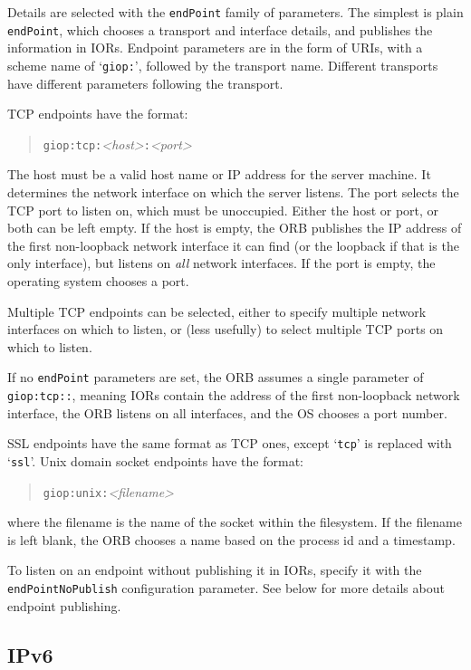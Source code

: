 \documentclass[11pt,twoside,a4paper]{book}
\newcommand{\code}[1]{\texttt{#1}}
\begin{document}
Details are selected with the \code{endPoint} family of parameters.
The simplest is plain \code{endPoint}, which chooses a transport and
interface details, and publishes the information in IORs. Endpoint
parameters are in the form of URIs, with a scheme name of
`\code{giop:}', followed by the transport name. Different transports
have different parameters following the transport.

TCP endpoints have the format:

\begin{quote}
\code{giop:tcp:}\textit{<host>}\code{:}\textit{<port>}
\end{quote}

\noindent The host must be a valid host name or IP address for the
server machine.  It determines the network interface on which the
server listens. The port selects the TCP port to listen on, which must
be unoccupied.  Either the host or port, or both can be left empty. If
the host is empty, the ORB publishes the IP address of the first
non-loopback network interface it can find (or the loopback if that is
the only interface), but listens on \emph{all} network interfaces. If
the port is empty, the operating system chooses a port.

Multiple TCP endpoints can be selected, either to specify multiple
network interfaces on which to listen, or (less usefully) to select
multiple TCP ports on which to listen.

If no \code{endPoint} parameters are set, the ORB assumes a single
parameter of \code{giop:tcp::}, meaning IORs contain the address of
the first non-loopback network interface, the ORB listens on all
interfaces, and the OS chooses a port number.

SSL endpoints have the same format as TCP ones, except `\code{tcp}'
is replaced with `\code{ssl}'. Unix domain socket endpoints have the
format:

\begin{quote}
\code{giop:unix:}\textit{<filename>}
\end{quote}

\noindent where the filename is the name of the socket within the
filesystem. If the filename is left blank, the ORB chooses a name
based on the process id and a timestamp.

To listen on an endpoint without publishing it in IORs, specify it
with the \code{endPointNoPublish} configuration parameter. See below
for more details about endpoint publishing.


\subsection{IPv6}
\end{document}
